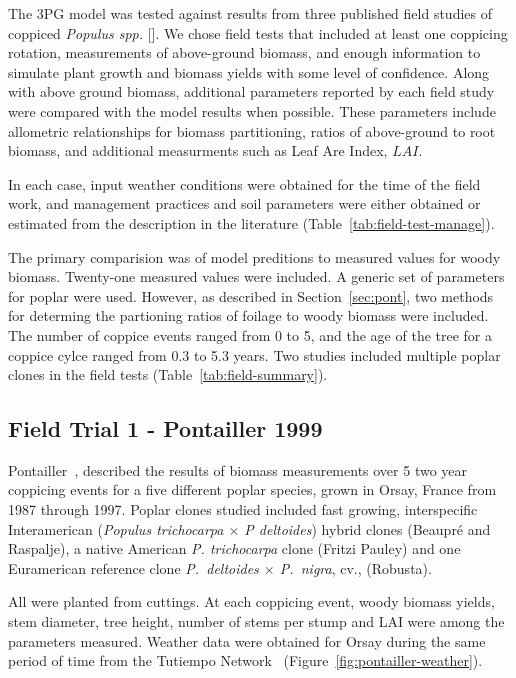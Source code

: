 \documentclass[10pt]{article}
\newcommand{\pop}{\textit{Populus spp.} }
\newcommand{\LAI}{\ensuremath{LAI}}
\begin{document}
The 3PG model was tested against results from three published field studies of
coppiced \pop [\cite{Proe2002,Proe1999,Pontailler1999,Afas2008a}]. We chose
field tests that included at least one coppicing rotation, measurements of
above-ground biomass, and enough information to simulate plant growth and
biomass yields with some level of confidence. Along with above ground biomass,
additional parameters reported by each field study were compared with the model
results when possible.  These parameters include allometric relationships for
biomass partitioning, ratios of above-ground to root biomass, and additional
measurments such as Leaf Are Index, \LAI.

In each case, input weather conditions were obtained for the time of the field
work, and management practices and soil parameters were either obtained or
estimated from the description in the literature (Table~\ref{tab:field-test-manage}).

The primary comparision was of model preditions to measured values for woody
biomass.  Twenty-one measured values were included.  A generic set of parameters
for poplar were used.  However, as described in Section~\ref{sec:pont}, two
methods for determing the partioning ratios of foilage to woody biomass were
included.  The number of coppice events ranged from 0 to 5, and the age of the
tree for a coppice cylce ranged from 0.3 to 5.3 years.  Two studies included
multiple poplar clones in the field tests (Table~\ref{tab:field-summary}).

\subsection*{Field Trial 1 - Pontailler 1999}
\label{sec:pont}

Pontailler~\cite{Pontailler1999,pontailler97-volume-index,Ceulemans1993},
described the results of biomass measurements over 5 two year coppicing events
for a five different poplar species, grown in Orsay, France from 1987 through
1997. Poplar clones studied included fast growing, interspecific Interamerican
(\textit{Populus trichocarpa $\times$ P deltoides}) hybrid clones (Beaupré and
Raspalje), a native American \textit{P. trichocarpa} clone (Fritzi Pauley) and
one Euramerican reference clone \textit{P.~deltoides $\times$ P.~nigra}, cv.,
(Robusta).

All were planted from cuttings. At each coppicing event, woody biomass yields,
stem diameter, tree height, number of stems per stump and LAI were among the
parameters measured.  Weather data were obtained for Orsay during the same
period of time from the Tutiempo Network~\cite{Geiger2002,TutiempoNetwork2013}
(Figure~\ref{fig:pontailler-weather}).
\end{document}

